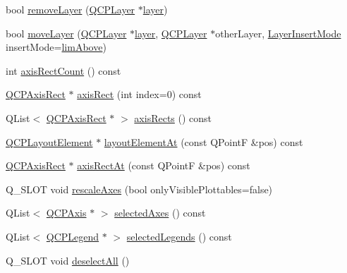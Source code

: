 \begin{DoxyCompactItemize}
\item 
bool \hyperlink{class_q_custom_plot_a40f75e342c5eaab6a86066a42a0e2a94}{remove\+Layer} (\hyperlink{class_q_c_p_layer}{Q\+C\+P\+Layer} $\ast$\hyperlink{class_q_custom_plot_a0a96244e7773b242ef23c32b7bdfb159}{layer})
\item 
bool \hyperlink{class_q_custom_plot_ae896140beff19424e9e9e02d6e331104}{move\+Layer} (\hyperlink{class_q_c_p_layer}{Q\+C\+P\+Layer} $\ast$\hyperlink{class_q_custom_plot_a0a96244e7773b242ef23c32b7bdfb159}{layer}, \hyperlink{class_q_c_p_layer}{Q\+C\+P\+Layer} $\ast$other\+Layer, \hyperlink{class_q_custom_plot_a75a8afbe6ef333b1f3d47abb25b9add7}{Layer\+Insert\+Mode} insert\+Mode=\hyperlink{class_q_custom_plot_a75a8afbe6ef333b1f3d47abb25b9add7a062b0b7825650b432a713c0df6742d41}{lim\+Above})
\item 
int \hyperlink{class_q_custom_plot_a8f85940aaac50efb466287d9d2d04ec6}{axis\+Rect\+Count} () const
\item 
\hyperlink{class_q_c_p_axis_rect}{Q\+C\+P\+Axis\+Rect} $\ast$ \hyperlink{class_q_custom_plot_ae5eefcb5f6ca26689b1fd4f6e25b42f9}{axis\+Rect} (int index=0) const
\item 
Q\+List$<$ \hyperlink{class_q_c_p_axis_rect}{Q\+C\+P\+Axis\+Rect} $\ast$ $>$ \hyperlink{class_q_custom_plot_a12af771429e2d7e313c8c5d5fca068fe}{axis\+Rects} () const
\item 
\hyperlink{class_q_c_p_layout_element}{Q\+C\+P\+Layout\+Element} $\ast$ \hyperlink{class_q_custom_plot_afaa1d304e0287d140fd238e90889ef3c}{layout\+Element\+At} (const Q\+PointF \&pos) const
\item 
\hyperlink{class_q_c_p_axis_rect}{Q\+C\+P\+Axis\+Rect} $\ast$ \hyperlink{class_q_custom_plot_a4a08842fc3e9ba6bed83aa410c5c5ba5}{axis\+Rect\+At} (const Q\+PointF \&pos) const
\item 
Q\+\_\+\+S\+L\+OT void \hyperlink{class_q_custom_plot_ad86528f2cee6c7e446dea4a6e8839935}{rescale\+Axes} (bool only\+Visible\+Plottables=false)
\item 
Q\+List$<$ \hyperlink{class_q_c_p_axis}{Q\+C\+P\+Axis} $\ast$ $>$ \hyperlink{class_q_custom_plot_a7e6b07792b1cb2c31681596582d14dbe}{selected\+Axes} () const
\item 
Q\+List$<$ \hyperlink{class_q_c_p_legend}{Q\+C\+P\+Legend} $\ast$ $>$ \hyperlink{class_q_custom_plot_ac87624ddff1cbf4064781a8e8ae321c4}{selected\+Legends} () const
\item 
Q\+\_\+\+S\+L\+OT void \hyperlink{class_q_custom_plot_a9d4808ab925b003054085246c92a257c}{deselect\+All} ()
\item 

\end{DoxyCompactItemize}
